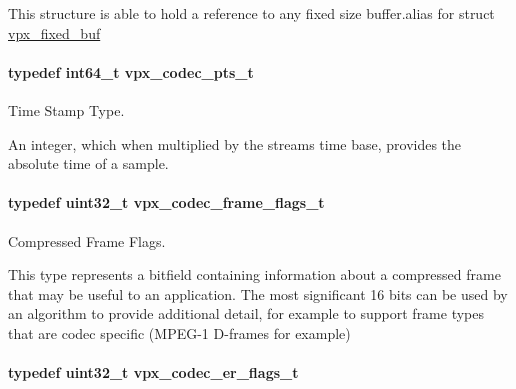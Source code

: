 This structure is able to hold a reference to any fixed size buffer.\+alias for struct \hyperlink{structvpx__fixed__buf}{vpx\+\_\+fixed\+\_\+buf} 
\paragraph[{\texorpdfstring{vpx\+\_\+codec\+\_\+pts\+\_\+t}{vpx_codec_pts_t}}]{\setlength{\rightskip}{0pt plus 5cm}typedef int64\+\_\+t {\bf vpx\+\_\+codec\+\_\+pts\+\_\+t}}\hypertarget{group__encoder_ga7e711b0a71c65aef8f0faea8bd57b05f}{}\label{group__encoder_ga7e711b0a71c65aef8f0faea8bd57b05f}


Time Stamp Type. 

An integer, which when multiplied by the stream\textquotesingle{}s time base, provides the absolute time of a sample. 
\paragraph[{\texorpdfstring{vpx\+\_\+codec\+\_\+frame\+\_\+flags\+\_\+t}{vpx_codec_frame_flags_t}}]{\setlength{\rightskip}{0pt plus 5cm}typedef uint32\+\_\+t {\bf vpx\+\_\+codec\+\_\+frame\+\_\+flags\+\_\+t}}\hypertarget{group__encoder_gaac8ee319b9a6175f6946f59437c7ae4b}{}\label{group__encoder_gaac8ee319b9a6175f6946f59437c7ae4b}


Compressed Frame Flags. 

This type represents a bitfield containing information about a compressed frame that may be useful to an application. The most significant 16 bits can be used by an algorithm to provide additional detail, for example to support frame types that are codec specific (M\+P\+E\+G-\/1 D-\/frames for example) 
\paragraph[{\texorpdfstring{vpx\+\_\+codec\+\_\+er\+\_\+flags\+\_\+t}{vpx_codec_er_flags_t}}]{\setlength{\rightskip}{0pt plus 5cm}typedef uint32\+\_\+t {\bf vpx\+\_\+codec\+\_\+er\+\_\+flags\+\_\+t}}\hypertarget{group__encoder_ga77e0e1fff62556a4f4d54c84467a41f3}{}\label{group__encoder_ga77e0e1fff62556a4f4d54c84467a41f3}


